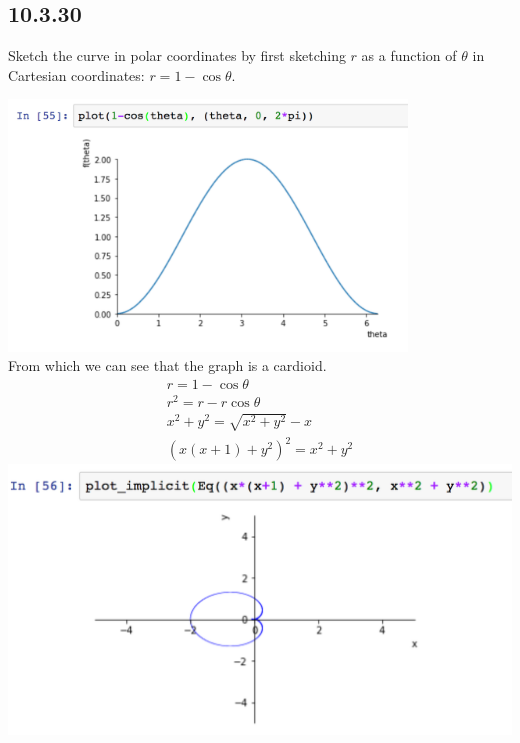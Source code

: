 \newpage
\subsection*{10.3.30}
Sketch the curve in polar coordinates by first sketching $r$ as a function of
$\theta$ in Cartesian coordinates: $r = 1 - \cos\theta$.
\begin{mdframed}
  \includegraphics[width=300pt]{img/10-3-30.png}\\
  From which we can see that the graph is a cardioid.
  \begin{align*}
    r = 1 - \cos\theta\\
    r^2 = r - r\cos\theta\\
    x^2 + y^2 = \sqrt{x^2 + y^2} - x\\
    (x(x+1) + y^2)^2 = x^2 + y^2
  \end{align*}
  \includegraphics[width=400pt]{img/10-3-30-2.png}
\end{mdframed}

